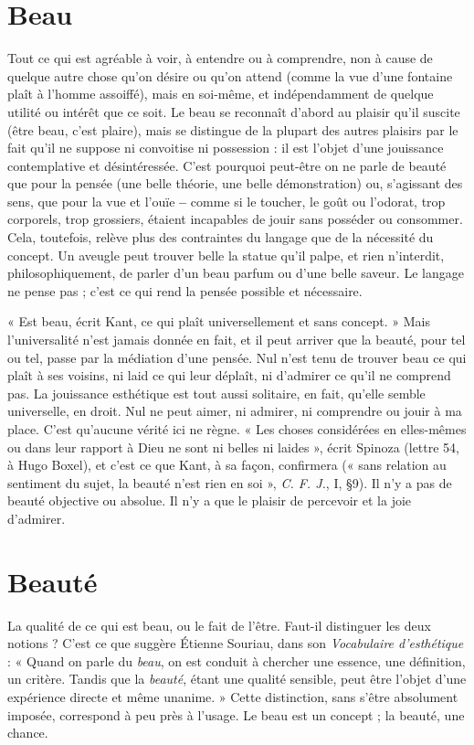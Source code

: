 \section{Beau}
Tout ce qui est agréable à voir, à entendre ou à comprendre, non à
cause de quelque autre chose qu’on désire ou qu’on attend (comme la
vue d’une fontaine plaît à l’homme assoiffé), mais en soi-même, et indépendamment
de quelque utilité ou intérêt que ce soit. Le beau se reconnaît d’abord
au plaisir qu’il suscite (être beau, c’est plaire), mais se distingue de la plupart
des autres plaisirs par le fait qu’il ne suppose ni convoitise ni possession : il est
l’objet d’une jouissance contemplative et désintéressée. C’est pourquoi peut-être
on ne parle de beauté que pour la pensée (une belle théorie, une belle
démonstration) ou, s’agissant des sens, que pour la vue et l’ouïe {\bf --} comme si le
toucher, le goût ou l’odorat, trop corporels, trop grossiers, étaient incapables de
jouir sans posséder ou consommer. Cela, toutefois, relève plus des contraintes
du langage que de la nécessité du concept. Un aveugle peut trouver belle la
statue qu’il palpe, et rien n’interdit, philosophiquement, de parler d’un beau
parfum ou d’une belle saveur. Le langage ne pense pas ; c’est ce qui rend la
pensée possible et nécessaire.

« Est beau, écrit Kant, ce qui plaît universellement et sans concept. » Mais
l'universalité n’est jamais donnée en fait, et il peut arriver que la beauté, pour
tel ou tel, passe par la médiation d’une pensée. Nul n’est tenu de trouver beau
ce qui plaît à ses voisins, ni laid ce qui leur déplaît, ni d'admirer ce qu’il ne
comprend pas. La jouissance esthétique est tout aussi solitaire, en fait, qu’elle
semble universelle, en droit. Nul ne peut aimer, ni admirer, ni comprendre ou
jouir à ma place. C’est qu'aucune vérité ici ne règne. « Les choses considérées
en elles-mêmes ou dans leur rapport à Dieu ne sont ni belles ni laides », écrit
Spinoza (lettre 54, à Hugo Boxel), et c’est ce que Kant, à sa façon, confirmera
(« sans relation au sentiment du sujet, la beauté n’est rien en soi », {\it C. F. J.}, I,
\S 9). Il n’y a pas de beauté objective ou absolue. Il n’y a que le plaisir de percevoir
et la joie d'admirer.

\section{Beauté}
La qualité de ce qui est beau, ou le fait de l’être. Faut-il distinguer
les deux notions ? C’est ce que suggère Étienne Souriau, dans son
{\it Vocabulaire d'esthétique} : « Quand on parle du {\it beau}, on est conduit à chercher
une essence, une définition, un critère. Tandis que la {\it beauté}, étant une qualité
sensible, peut être l’objet d’une expérience directe et même unanime. » Cette
distinction, sans s’être absolument imposée, correspond à peu près à l'usage. Le
beau est un concept ; la beauté, une chance.

